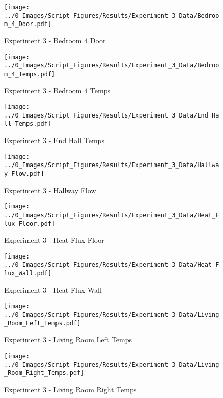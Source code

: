	\clearpage

	\begin{figure}[H]
		\centering
		\texttt{[image: ../0\_Images/Script\_Figures/Results/Experiment\_3\_Data/Bedroom\_4\_Door.pdf]}
		\caption[]{Experiment 3 - Bedroom 4 Door}
	\end{figure}
 

	\begin{figure}[H]
		\centering
		\texttt{[image: ../0\_Images/Script\_Figures/Results/Experiment\_3\_Data/Bedroom\_4\_Temps.pdf]}
		\caption[]{Experiment 3 - Bedroom 4 Temps}
	\end{figure}
 
	\clearpage

	\begin{figure}[H]
		\centering
		\texttt{[image: ../0\_Images/Script\_Figures/Results/Experiment\_3\_Data/End\_Hall\_Temps.pdf]}
		\caption[]{Experiment 3 - End Hall Temps}
	\end{figure}
 

	\begin{figure}[H]
		\centering
		\texttt{[image: ../0\_Images/Script\_Figures/Results/Experiment\_3\_Data/Hallway\_Flow.pdf]}
		\caption[]{Experiment 3 - Hallway Flow}
	\end{figure}
 
	\clearpage

	\begin{figure}[H]
		\centering
		\texttt{[image: ../0\_Images/Script\_Figures/Results/Experiment\_3\_Data/Heat\_Flux\_Floor.pdf]}
		\caption[]{Experiment 3 - Heat Flux Floor}
	\end{figure}
 

	\begin{figure}[H]
		\centering
		\texttt{[image: ../0\_Images/Script\_Figures/Results/Experiment\_3\_Data/Heat\_Flux\_Wall.pdf]}
		\caption[]{Experiment 3 - Heat Flux Wall}
	\end{figure}
 
	\clearpage

	\begin{figure}[H]
		\centering
		\texttt{[image: ../0\_Images/Script\_Figures/Results/Experiment\_3\_Data/Living\_Room\_Left\_Temps.pdf]}
		\caption[]{Experiment 3 - Living Room Left Temps}
	\end{figure}
 

	\begin{figure}[H]
		\centering
		\texttt{[image: ../0\_Images/Script\_Figures/Results/Experiment\_3\_Data/Living\_Room\_Right\_Temps.pdf]}
		\caption[]{Experiment 3 - Living Room Right Temps}
	\end{figure}
 
